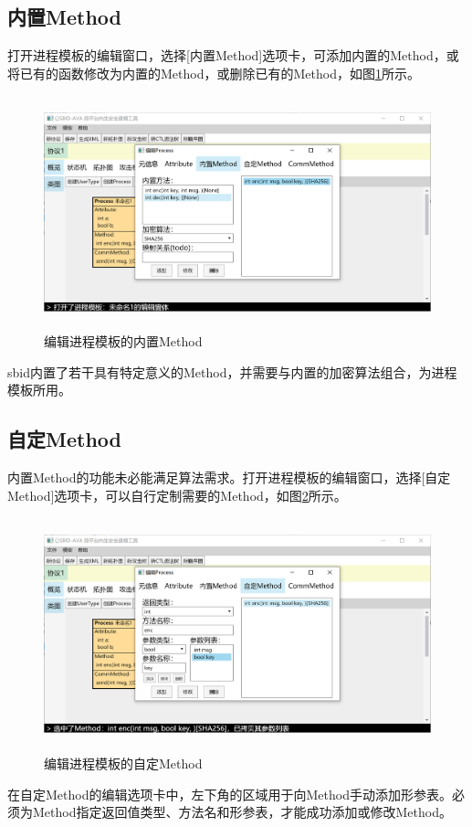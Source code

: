 \subsection{内置Method}
打开进程模板的编辑窗口，选择[内置Method]选项卡，可添加内置的Method，或将已有的函数修改为内置的Method，或删除已有的Method，如图\ref{process_edit_innermethod}所示。
\begin{figure}[h]
	\centering
	\includegraphics[width=12cm,height=6.75cm]{imgs/process_edit_innermethod.png}
	\caption{编辑进程模板的内置Method}
	\label{process_edit_innermethod}
\end{figure}
\par
sbid内置了若干具有特定意义的Method，并需要与内置的加密算法组合，为进程模板所用。
\subsection{自定Method}
内置Method的功能未必能满足算法需求。打开进程模板的编辑窗口，选择[自定Method]选项卡，可以自行定制需要的Method，如图\ref{process_edit_zdmethod}所示。
\begin{figure}[h]
	\centering
	\includegraphics[width=12cm,height=6.75cm]{imgs/process_edit_zdmethod.png}
	\caption{编辑进程模板的自定Method}
	\label{process_edit_zdmethod}
\end{figure}
\par
在自定Method的编辑选项卡中，左下角的区域用于向Method手动添加形参表。必须为Method指定返回值类型、方法名和形参表，才能成功添加或修改Method。

